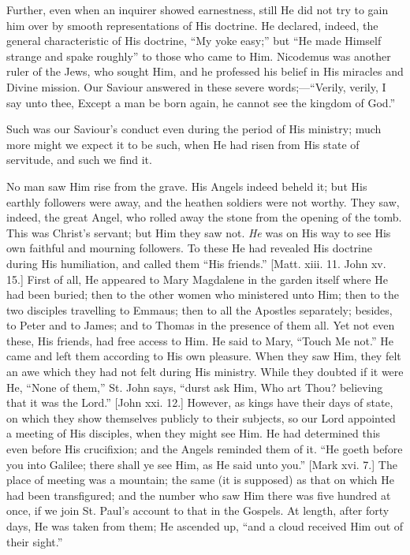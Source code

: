 Further, even when an inquirer showed earnestness,
still He did not try to gain him over by smooth
representations of His doctrine. He declared, indeed, the
general characteristic of His doctrine, ``My yoke
easy;'' but ``He made Himself strange and spake
roughly'' to those who came to Him. Nicodemus was
another ruler of the Jews, who sought Him, and he
professed his belief in His miracles and Divine mission.
Our Saviour answered in these severe
words;—``Verily, verily, I say unto thee, Except
a man be born again, he cannot see the kingdom of
God.''

Such was our Saviour's conduct even during the period
of His ministry; much more might we expect it to be such,
when He had risen from His state of servitude, and such
we find it.

No man saw Him rise from the grave. His Angels indeed
beheld it; but His earthly followers were away, and the
heathen soldiers were not worthy. They saw, indeed, the
great Angel, who rolled away the stone from the opening
of the tomb. This was Christ's servant; but Him they saw
not. \emph{He} was on His way to see His own faithful and
mourning followers. To these He had revealed His doctrine
during His humiliation, and called them ``His
friends.'' [Matt. xiii. 11. John xv. 15.] First of
all, He appeared to Mary Magdalene in the garden itself
where He had been buried; then to the other women who
ministered unto Him; then to the two disciples travelling
to Emmaus; then to all the Apostles separately; besides,
to Peter and to James; and to Thomas in the presence of
them all. Yet not even these, His friends, had free
access to Him. He said to Mary, ``Touch Me not.''
He came and left them according to His own pleasure. When
they saw Him, they felt an awe which they had not felt
during His ministry. While they doubted if it were He,
``None of them,'' St. John says, ``durst ask
Him, Who art Thou? believing that it was the Lord.''
[John xxi. 12.] However, as kings have their days of
state, on which they show themselves publicly to their
subjects, so our Lord appointed a meeting of His
disciples, when they might see Him. He had determined
this even before His crucifixion; and the Angels reminded
them of it. ``He goeth before you into Galilee; there
shall ye see Him, as He said unto you.'' [Mark xvi.
7.] The place of meeting was a mountain; the same (it is
supposed) as that on which He had been transfigured; and
the number who saw Him there was five hundred at once, if
we join St. Paul's account to that in the Gospels. At
length, after forty days, He was taken from them; He
ascended up, ``and a cloud received Him out of their
sight.''

